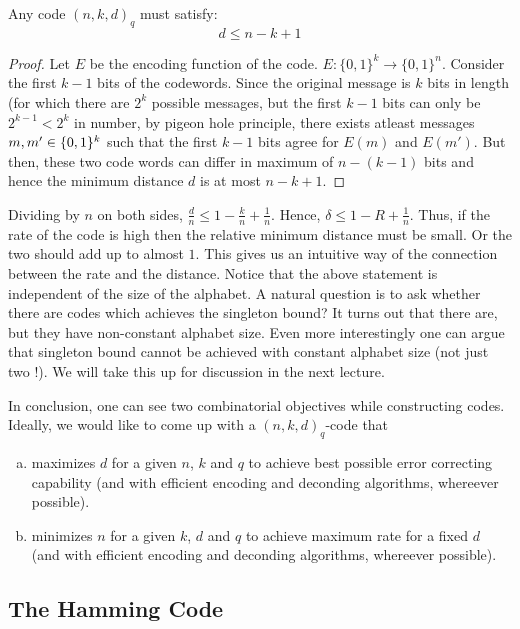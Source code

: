 \begin{theorem}
Any code $(n,k,d)_q$ must satisfy:
$$d \leq n-k+1$$
\end{theorem}
\begin{proof}
Let $E$ be the encoding function of the code. $E:\{0,1\}^k \xrightarrow{} \{0,1\}^n$. Consider the first $k-1$ bits of the codewords. Since the original message is $k$ bits in length (for which there are $2^k$ possible messages, but the first $k-1$ bits can only be $2^{k-1} < 2^k$ in number, by pigeon hole principle, there exists atleast messages $m, m' \in \{0,1\}^k$ such that the first $k-1$ bits agree for $E(m)$ and $E(m')$. But then, these two code words can differ in maximum of $n-(k-1)$ bits and hence the minimum distance $d$ is at most $n-k+1$.
\end{proof}

Dividing by $n$ on both sides, $\frac{d}{n} \le  1-\frac{k}{n} + \frac{1}{n}$. Hence, $\delta \le 1-R+\frac{1}{n}$. Thus, if the rate of the code is high then the relative minimum distance must be small. Or the two should add up to almost $1$. This gives us an intuitive way of the connection between the rate and the distance. Notice that the above statement is independent of the size of the alphabet. A natural question is to ask whether there are codes which achieves the singleton bound? It turns out that there are, but they have non-constant alphabet size. Even more interestingly one can argue that singleton bound cannot be achieved with constant alphabet size (not just two !). We will take this up for discussion in the next lecture.

In conclusion, one can see two combinatorial objectives while constructing codes. Ideally, we would like to come up with a $(n,k,d)_q$-code that
\begin{enumerate}[(a)]
\item maximizes $d$ for a given $n$, $k$ and $q$ to achieve best possible error correcting capability (and with efficient encoding and deconding algorithms, whereever possible).
\item minimizes $n$ for a given $k$, $d$ and $q$ to achieve maximum rate for a fixed $d$ (and with efficient encoding and deconding algorithms, whereever possible).
\end{enumerate}

\subsection{The Hamming Code}

